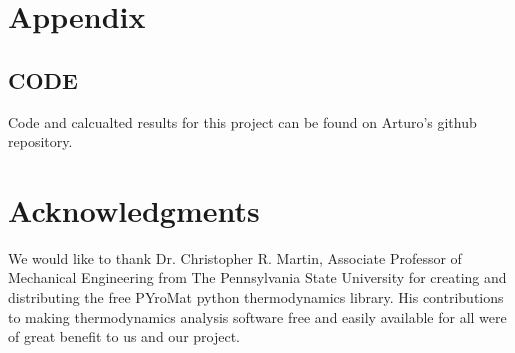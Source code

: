 \documentclass[conf]{new-aiaa}
\begin{document}
\section*{Appendix}

\subsection{CODE}

Code and calcualted results for this project can be found on Arturo's github repository.\cite{Saucedo_ME400_MP3_Software_2023}

\section*{Acknowledgments}
We would like to thank Dr. Christopher R. Martin, Associate Professor of Mechanical Engineering from The Pennsylvania State University for creating and distributing the free PYroMat python thermodynamics library. His contributions to making thermodynamics analysis software free and easily available for all were of great benefit to us and our project.


\end{document}
